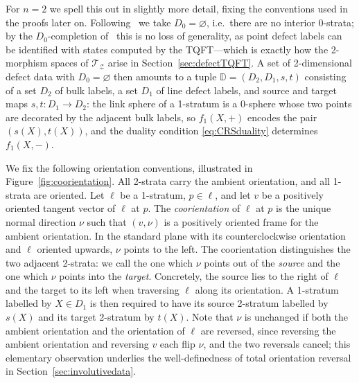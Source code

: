 \documentclass[11pt]{article}
\theoremstyle{definition}
\newcommand{\cT}{\mathcal{T}}
\newcommand{\cZ}{\mathcal{Z}}
\newcommand{\bD}{\mathbb{D}}
\begin{document}
For $n = 2$ we spell this out in slightly more detail, fixing the conventions used in the proofs later on. Following~\cite{Car16} we take $D_0 = \varnothing$, i.e.\ there are no interior 0-strata; by the $D_0$-completion of~\cite[\S 2.4]{CRS18} this is no loss of generality, as point defect labels can be identified with states computed by the TQFT---which is exactly how the 2-morphism spaces of $\cT_\cZ$ arise in Section~\ref{sec:defectTQFT}. A set of 2-dimensional defect data with $D_0 = \varnothing$ then amounts to a tuple $\bD = (D_2, D_1, s, t)$ consisting of a set $D_2$ of bulk labels, a set $D_1$ of line defect labels, and source and target maps $s,t \colon D_1 \to D_2$: the link sphere of a 1-stratum is a 0-sphere whose two points are decorated by the adjacent bulk labels, so $f_1(X,+)$ encodes the pair $(s(X), t(X))$, and the duality condition \eqref{eq:CRSduality} determines $f_1(X,-)$.

We fix the following orientation conventions, illustrated in Figure~\ref{fig:coorientation}. All 2-strata carry the ambient orientation, and all 1-strata are oriented. Let $\ell$ be a 1-stratum, $p \in \ell$, and let $v$ be a positively oriented tangent vector of $\ell$ at $p$. The \emph{coorientation} of $\ell$ at $p$ is the unique normal direction $\nu$ such that $(v, \nu)$ is a positively oriented frame for the ambient orientation. In the standard plane with its counterclockwise orientation and $\ell$ oriented upwards, $\nu$ points to the left. The coorientation distinguishes the two adjacent 2-strata: we call the one which $\nu$ points out of the \emph{source} and the one which $\nu$ points into the \emph{target}. Concretely, the source lies to the right of $\ell$ and the target to its left when traversing $\ell$ along its orientation. A 1-stratum labelled by $X \in D_1$ is then required to have its source 2-stratum labelled by $s(X)$ and its target 2-stratum by $t(X)$. Note that $\nu$ is unchanged if both the ambient orientation and the orientation of $\ell$ are reversed, since reversing the ambient orientation and reversing $v$ each flip $\nu$, and the two reversals cancel; this elementary observation underlies the well-definedness of total orientation reversal in Section~\ref{sec:involutivedata}.
\end{document}
